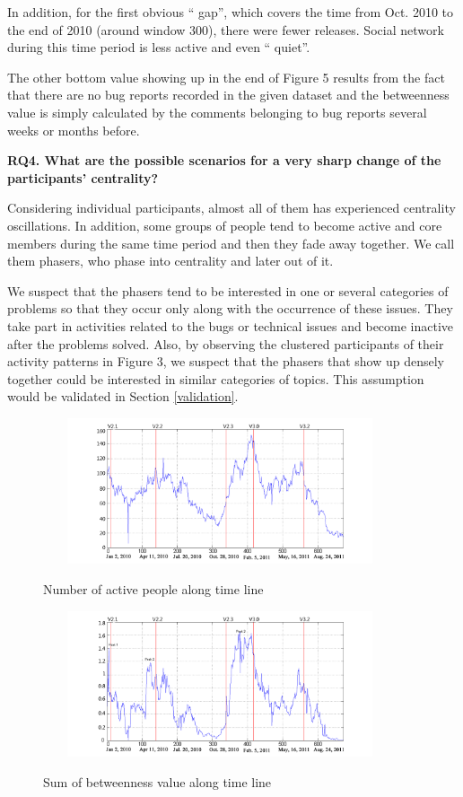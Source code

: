 \documentclass[10pt, conference, compsocconf]{IEEEtran}
\begin{document}
In addition, for the first obvious  \textquotedblleft
gap\textquotedblright, which covers the time from Oct. 2010 to the end
of 2010 (around window 300), there were fewer releases. Social network
during this time period is less active and even \textquotedblleft
quiet\textquotedblright.


The other bottom value showing up in the end of Figure 5 results from
the fact that there are no bug reports recorded in the given dataset
and the betweenness value is simply calculated by the comments
belonging to bug reports several weeks or months before. 


\textbf{RQ4. What are the possible scenarios for a very sharp change of the participants' centrality?}

Considering individual participants, almost all of them has
experienced centrality oscillations. In addition, some groups of
people tend to become active and core members during the same time
period and then they fade away together. We call them phasers, who
phase into centrality and later out of it.


We suspect that the phasers tend to be interested in one or several
categories of problems so that they occur only along with the
occurrence of these issues. They take part in activities related to
the bugs or technical issues and become inactive after the problems
solved. Also, by observing the clustered participants of their
activity patterns in Figure 3, we suspect that the phasers that show
up densely together could be interested in similar categories of
topics. This assumption would be validated in Section
\ref{validation}. 


\begin{figure}[!t]
\centerline{\includegraphics[width=4.1in, height = 4.3cm]{people.png}
\label{people}}
\caption{Number of active people along time line}
\end{figure}

\begin{figure}[!t]
\centerline{\includegraphics[width=4.1in, height = 4.3cm]{betweenness.png}
\label{betweenness}}
\caption{Sum of betweenness value along time line}
\end{figure}
\end{document}
